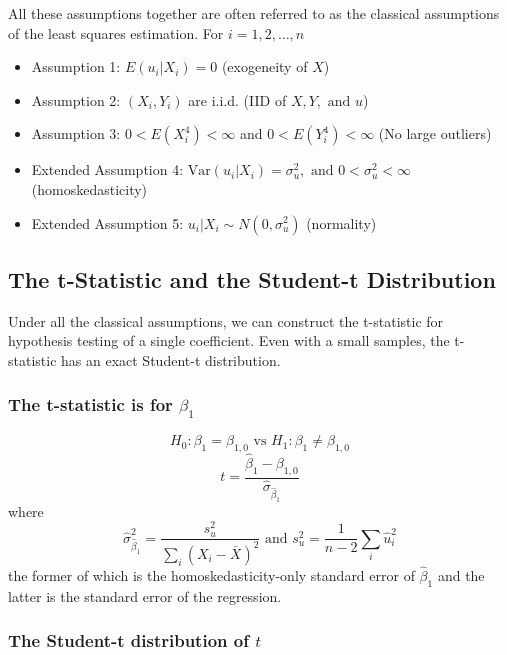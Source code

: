 \documentclass[a4paper,11pt]{article}
\newcommand{\var}{\mathrm{Var}}
\begin{document}
All these assumptions together are often referred to as the classical
assumptions of the least squares estimation. 
For \(i = 1, 2, \ldots, n\)
\begin{itemize}
\item Assumption 1: \(E(u_i | X_i) = 0\) (exogeneity of \(X\))
\item Assumption 2: \((X_i, Y_i)\) are i.i.d. (IID of \(X, Y, \text{ and }
                   u\))
\item Assumption 3: \(0 < E(X_i^4) < \infty\) and \(0 < E(Y_i^4) < \infty\)
(No large outliers)
\item Extended Assumption 4: \(\var(u_i | X_i) = \sigma^2_u, \text{ and } 0 <
                   \sigma^2_u < \infty\) (homoskedasticity)
\item Extended Assumption 5: \(u_i | X_i \sim N(0, \sigma^2_u)\) (normality)
\end{itemize}

\subsection{The t-Statistic and the Student-t Distribution}
\label{sec:org5ad4bf1}
Under all the classical assumptions, we can construct the
t-statistic for hypothesis testing of a single coefficient. Even with
a small samples, the t-statistic has an exact Student-t distribution. 

\subsubsection*{The t-statistic is for \(\beta_1\)}
\label{sec:org2611d8c}

\[H_0: \beta_1 = \beta_{1,0} \text{ vs } H_1: \beta_1 \neq \beta_{1,0}\]
\begin{equation}
t = \frac{\hat{\beta}_1 - \beta_{1,0}}{\hat{\sigma}_{\hat{\beta}_1}}
\end{equation}
where
\begin{equation*}
\hat{\sigma}^2_{\hat{\beta}_1} = \frac{s^2_u}{\sum_i (X_i - \bar{X})^2} \text{ and } s^2_u = \frac{1}{n-2}\sum_i \hat{u}_i^2
\end{equation*}
the former of which is the homoskedasticity-only standard error of
\(\hat{\beta}_1\) and the latter is the standard error of the
regression. 

\subsubsection*{The Student-t distribution of \(t\)}
\label{sec:orgf23cbdf}
\end{document}
